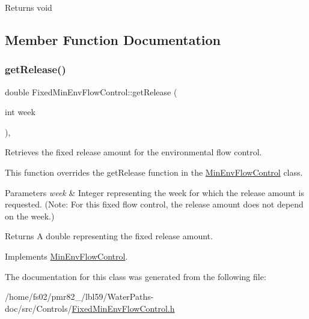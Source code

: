 \begin{DoxyReturn}{Returns}
void 
\end{DoxyReturn}


\subsection{Member Function Documentation}
\mbox{\label{classFixedMinEnvFlowControl_af3ef98eef6a7124738a3b54dcadf757f}} 
\subsubsection{\texorpdfstring{get\+Release()}{getRelease()}}
{\footnotesize\ttfamily double Fixed\+Min\+Env\+Flow\+Control\+::get\+Release (\begin{DoxyParamCaption}\item[{int}]{week }\end{DoxyParamCaption})\hspace{0.3cm}{\ttfamily [override]}, {\ttfamily [virtual]}}



Retrieves the fixed release amount for the environmental flow control. 

This function overrides the {\ttfamily get\+Release} function in the {\ttfamily \mbox{\hyperlink{classMinEnvFlowControl}{Min\+Env\+Flow\+Control}}} class.


\begin{DoxyParams}{Parameters}
{\em week} & Integer representing the week for which the release amount is requested. (Note\+: For this fixed flow control, the release amount does not depend on the week.)\\
\hline
\end{DoxyParams}
\begin{DoxyReturn}{Returns}
A double representing the fixed release amount. 
\end{DoxyReturn}


Implements \mbox{\hyperlink{classMinEnvFlowControl_a5de79615852eb0c937dd559a9eb9402d}{Min\+Env\+Flow\+Control}}.



The documentation for this class was generated from the following file\+:\begin{DoxyCompactItemize}
\item 
/home/fs02/pmr82\+\_/lbl59/\+Water\+Paths-\/doc/src/\+Controls/\mbox{\hyperlink{FixedMinEnvFlowControl_8h}{Fixed\+Min\+Env\+Flow\+Control.\+h}}\end{DoxyCompactItemize}
